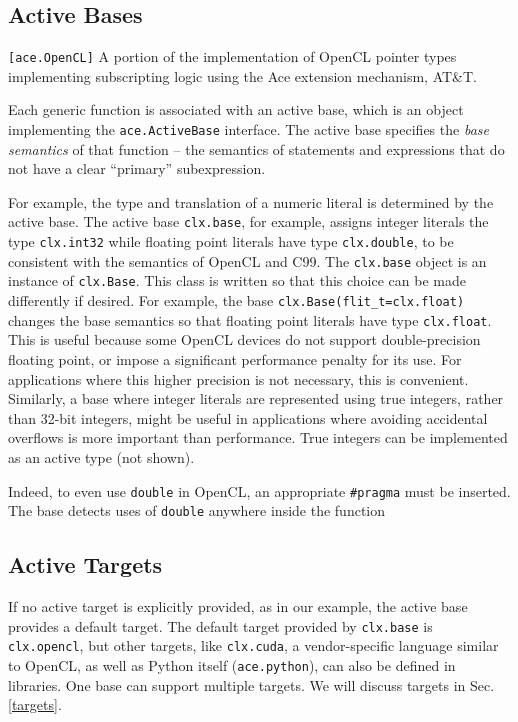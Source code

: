 \documentclass[9pt,preprint]{sigplanconf}
\begin{document}
\subsection{Active Bases}\label{abases}
\begin{codelisting}

\caption{\texttt{[ace.OpenCL]} A portion of the implementation of OpenCL pointer types implementing subscripting logic using the Ace extension mechanism, AT\&T.}
\label{pointers}
\end{codelisting}
Each generic function is associated with an active base, which is an object implementing the \verb|ace.ActiveBase| interface. The active base specifies the \emph{base semantics} of that function -- the semantics of statements and expressions that do not have a clear ``primary'' subexpression. 

For example, the type and translation of a numeric literal is determined by the active base. The active base \verb|clx.base|, for example, assigns integer literals the type \verb|clx.int32| while floating point literals have type \verb|clx.double|, to be consistent with the semantics of OpenCL and C99. The \verb|clx.base| object is an instance of \verb|clx.Base|. This class is written so that this choice can be made differently if desired. For example, the base \verb|clx.Base(flit_t=clx.float)| changes the base semantics so that floating point literals have type \verb|clx.float|. This is useful because some OpenCL devices do not support double-precision floating point, or impose a significant performance penalty for its use. For applications where this higher precision is not necessary, this is convenient. Similarly, a base where integer literals are represented using true integers, rather than 32-bit integers, might be useful in  applications where avoiding accidental overflows is more important than performance. True integers can be implemented as an active type (not shown).

Indeed, to even use \verb|double| in OpenCL, an appropriate \verb|#pragma| must be inserted. The base detects uses of \verb|double| anywhere inside the function 

\subsection{Active Targets}\label{atargets}

If no active target is explicitly provided, as in our example, the active base  provides a default target. The default target provided by \verb|clx.base| is \verb|clx.opencl|, but other targets, like \verb|clx.cuda|, a vendor-specific language similar to OpenCL, as well as Python itself (\verb|ace.python|), can also be defined in libraries. One base can support multiple targets. We will discuss targets in Sec. \ref{targets}.
\end{document}

